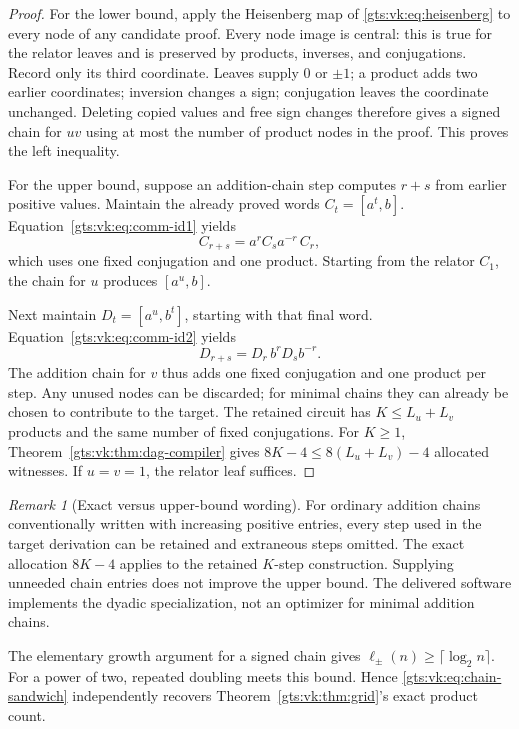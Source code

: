\documentclass[11pt,letterpaper]{article}
\theoremstyle{definition}
\theoremstyle{remark}
\newtheorem{remark}[theorem]{Remark}
\begin{document}
\begin{proof}
For the lower bound, apply the Heisenberg map of \eqref{gts:vk:eq:heisenberg} to every node of any candidate proof. Every node image is central: this is true for the relator leaves and is preserved by products, inverses, and conjugations. Record only its third coordinate. Leaves supply $0$ or $\pm1$; a product adds two earlier coordinates; inversion changes a sign; conjugation leaves the coordinate unchanged. Deleting copied values and free sign changes therefore gives a signed chain for $uv$ using at most the number of product nodes in the proof. This proves the left inequality.

For the upper bound, suppose an addition-chain step computes $r+s$ from earlier positive values. Maintain the already proved words $C_t=[a^t,b]$. Equation~\eqref{gts:vk:eq:comm-id1} yields
\[
 C_{r+s}=a^rC_sa^{-r}\,C_r,
\]
which uses one fixed conjugation and one product. Starting from the relator $C_1$, the chain for $u$ produces $[a^u,b]$.

Next maintain $D_t=[a^u,b^t]$, starting with that final word. Equation~\eqref{gts:vk:eq:comm-id2} yields
\[
 D_{r+s}=D_r\,b^rD_sb^{-r}.
\]
The addition chain for $v$ thus adds one fixed conjugation and one product per step. Any unused nodes can be discarded; for minimal chains they can already be chosen to contribute to the target. The retained circuit has $K\leq L_u+L_v$ products and the same number of fixed conjugations. For $K\geq1$, Theorem~\ref{gts:vk:thm:dag-compiler} gives $8K-4\leq8(L_u+L_v)-4$ allocated witnesses. If $u=v=1$, the relator leaf suffices.
\end{proof}

\begin{remark}[Exact versus upper-bound wording]
For ordinary addition chains conventionally written with increasing positive entries, every step used in the target derivation can be retained and extraneous steps omitted. The exact allocation $8K-4$ applies to the retained $K$-step construction. Supplying unneeded chain entries does not improve the upper bound. The delivered software implements the dyadic specialization, not an optimizer for minimal addition chains.
\end{remark}

The elementary growth argument for a signed chain gives
$\ell_{\pm}(n)\geq\lceil\log_2n\rceil$. For a power of two, repeated doubling meets this bound. Hence \eqref{gts:vk:eq:chain-sandwich} independently recovers Theorem~\ref{gts:vk:thm:grid}'s exact product count.
\end{document}
